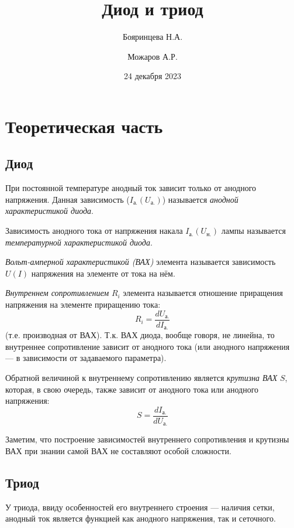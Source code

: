 \documentclass{article}
\title{Диод и триод}
\author{Бояринцева Н.А. \and Можаров А.Р.}
\date{24 декабря 2023}
\begin{document}
\maketitle

\section*{\centering Теоретическая часть}

\subsection*{Диод}

При постоянной температуре анодный ток зависит только от анодного напряжения.
Данная зависимость ($I_\text{а.}(U_\text{а.})$) называется {\it анодной характеристикой диода}.

Зависимость анодного тока от напряжения накала $I_\text{а.}(U_\text{н.})$
лампы называется {\it температурной характеристикой диода}.

{\it Вольт-амперной характеристикой (ВАХ)} элемента называется
зависимость $U(I)$ напряжения на элементе от тока на нём.

{\it Внутреннем сопротивлением} $R_i$ элемента называется отношение приращения напряжения
на элементе приращению тока:
\begin{equation*}
    R_i = \dfrac{dU_\text{а.}}{dI_\text{а.}}
\end{equation*}
(т.е. производная от ВАХ). Т.к. ВАХ диода, вообще говоря,
не линейна, то внутреннее сопротивление зависит от анодного тока
(или анодного напряжения --- в зависимости от задаваемого параметра).

Обратной величиной к внутреннему сопротивлению является {\it крутизна ВАХ} $S$,
которая, в свою очередь, также зависит от анодного тока или анодного напряжения:
\begin{equation*}
    S = \dfrac{dI_\text{а.}}{dU_\text{а.}}
\end{equation*}

Заметим, что построение зависимостей внутреннего сопротивления
и крутизны ВАХ при знании самой ВАХ не составляют особой сложности.

\subsection*{Триод}

У триода, ввиду особенностей его внутреннего строения --- наличия сетки, анодный ток
является функцией как анодного напряжения, так и сеточного.
\end{document}
